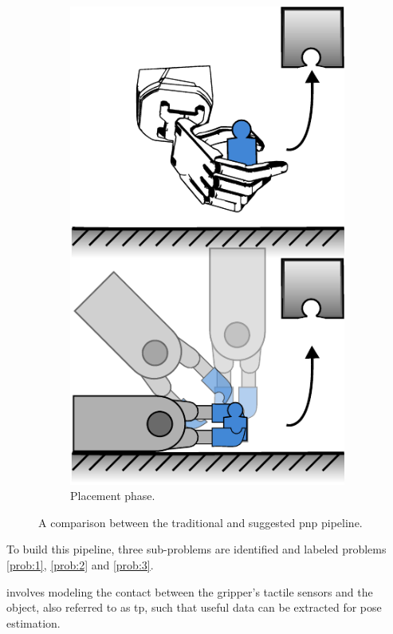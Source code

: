 \begin{figure}[h]
\begin{subfigure}[b]{0.24\textwidth}
		\includegraphics[width=\textwidth]{chapters/introduction/fig/pipeline-4.pdf}
		\caption{Placement phase.\newline}
		\label{fig:placement-phase}
	\end{subfigure}
		\caption{A comparison between the traditional and suggested \gls{pnp} pipeline.}
		\label{fig:pnp-pipeline}
\end{figure}

To build this pipeline, three sub-problems are identified and labeled problems \ref{prob:1}, \ref{prob:2} and \ref{prob:3}.
\begin{problem} \label{prob:1}
	\normalfont involves modeling the contact between the gripper's tactile sensors and the object, also referred to as \gls{tp}, such that useful data can be extracted for pose estimation.
\end{problem}

